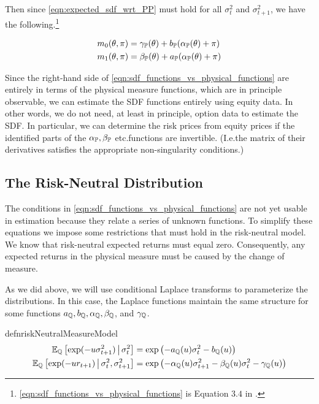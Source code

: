 \documentclass[11pt, letterpaper, twoside, final]{article}
\begin{document}
Then since \cref{eqn:expected_sdf_wrt_PP} must hold for all $\sigma^2_t$ and $\sigma^2_{t+1}$, we have the
following.\footnote{\cref{eqn:sdf_functions_vs_physical_functions} is Equation $3.4$ in 
\textcite[3.4]{khrapov2016affine}.}

\begin{align}
    \label{eqn:sdf_functions_vs_physical_functions}
    m_0(\theta, \pi)  &= \gamma_{\mathbb{P}}(\theta) + b_{\mathbb{P}}(\alpha_{\mathbb{P}}(\theta) + \pi) \\
    m_1(\theta, \pi)  &= \beta_{\mathbb{P}}(\theta) + a_{\mathbb{P}}(\alpha_{\mathbb{P}}(\theta) + \pi) \nonumber
\end{align}

Since the right-hand side of \cref{eqn:sdf_functions_vs_physical_functions} are entirely in terms of the physical
measure functions, which are in principle observable, we can estimate the SDF functions entirely using equity
data.
In other words, we do not need, at least in principle, option data to estimate the SDF.
In particular, we can determine the risk prices from equity prices if the identified parts of the $\alpha_{\mathbb{P}},
\beta_{\mathbb{P}}$ etc.\@ functions are  invertible.
(I.e.\@ the matrix of their derivatives satisfies the appropriate non-singularity conditions.)

\subsection{The Risk-Neutral Distribution}

The conditions in \cref{eqn:sdf_functions_vs_physical_functions} are not yet usable in estimation because they
relate a series of unknown functions.
To simplify these equations we impose some restrictions that must hold in the risk-neutral model. 
We know that risk-neutral expected returns must equal zero.
Consequently, any expected returns in the physical measure must be caused by the change of measure.

As we did above, we will use conditional Laplace transforms to parameterize the distributions.
In this case, the Laplace functions maintain the same structure for some functions $a_{\mathbb{Q}}, b_{\mathbb{Q}},
\alpha_{\mathbb{Q}}, \beta_{\mathbb{Q}}$, and $\gamma_{\mathbb{Q}}$.

\begin{restatable}{defn}{riskNeutralMeasureModel}
    \label{defn:risk_neutral_model}
    \begin{align}
        \operatorname{\mathbb{E}}_{\mathbb{Q}} \left[\exp(-u \sigma^2_{t+1}) \,\middle\vert\, \sigma^2_t \right] &= \exp\left( - a_{\mathbb{Q}}(u) \sigma^2_t -
        b_{\mathbb{Q}}(u) \right) \\
        \operatorname{\mathbb{E}}_{\mathbb{Q}}\left[\exp(-u r_{t+1}) \,\middle\vert\, \sigma^2_t,  \sigma^2_{t+1}\right] &= \exp\left(- \alpha_{\mathbb{Q}}(u)
        \sigma^2_{t+1} - \beta_{\mathbb{Q}}(u)\sigma^2_t - \gamma_{\mathbb{Q}}(u) \right) 
    \end{align}
\end{restatable}
\end{document}
